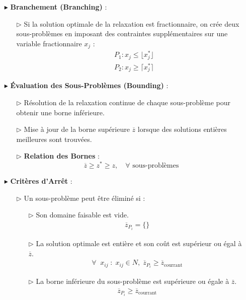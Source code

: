 \documentclass{report}
\begin{document}
\begin{multicols*}{2}
\begin{itemize}
    \item[$\blacktriangleright$] \textbf{Branchement (Branching)} :
    \begin{itemize}
        \item[$\rhd$] Si la solution optimale de la relaxation est fractionnaire, on crée deux sous-problèmes en imposant des contraintes supplémentaires sur une variable fractionnaire \( x_j \) :
        \[
        \begin{aligned}
            & P_1 : x_j \leq \lfloor x_j^* \rfloor \\
            & P_2 : x_j \geq \lceil x_j^* \rceil
        \end{aligned}
        \]
    \end{itemize}

    \item[$\blacktriangleright$] \textbf{Évaluation des Sous-Problèmes (Bounding)} :
    \begin{itemize}
        \item[$\rhd$] Résolution de la relaxation continue de chaque sous-problème pour obtenir une borne inférieure.
        \item[$\rhd$] Mise à jour de la borne supérieure \( \overline{z} \) lorsque des solutions entières meilleures sont trouvées.
        \item[$\rhd$] \textbf{Relation des Bornes} :
        \[
        \overline{z} \geq z^* \geq z, \quad \forall \text{ sous-problèmes}
        \]
    \end{itemize}

    \item[$\blacktriangleright$] \textbf{Critères d'Arrêt} :
    \begin{itemize}
        \item[$\rhd$] Un sous-problème peut être éliminé si :
        \begin{itemize}
            \item[$\rhd$] Son domaine faisable est vide.
                \begin{align*}
                    \overline{z}_{P_i} = \{ \}
                \end{align*}
            \item[$\rhd$] La solution optimale est entière et son coût est supérieur ou égal à \( \overline{z} \).
                \begin{align*}
                    \forall \;\; x_{ij} \; : \; x_{ij} \in {N}, \; 
                    \overline{z}_{P_i} \geq \overline{z}_{\text{courrant}}
                \end{align*}
            \item[$\rhd$] La borne inférieure du sous-problème est supérieure ou égale à \( \overline{z} \).
                \begin{align*}
                \overline{z}_{P_i} \geq \overline{z}_{\text{courrant}} 
                \end{align*}            
        \end{itemize}
    \end{itemize}


\end{itemize}
\end{multicols*}
\end{document}
